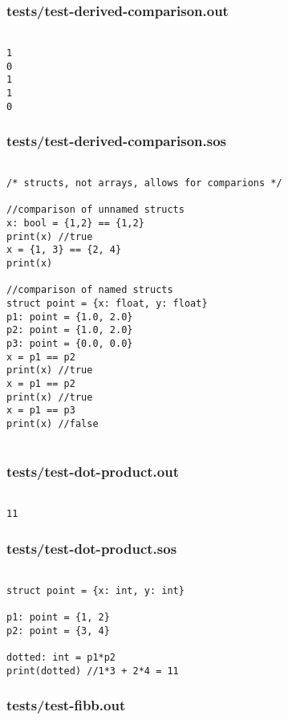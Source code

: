 \documentclass[main.tex]{subfiles}
\begin{document}
\subsubsection{tests/test-derived-comparison.out}

\begin{lstlisting}

1
0
1
1
0
\end{lstlisting}

\subsubsection{tests/test-derived-comparison.sos}

\begin{lstlisting}

/* structs, not arrays, allows for comparions */

//comparison of unnamed structs
x: bool = {1,2} == {1,2}
print(x) //true
x = {1, 3} == {2, 4}
print(x)

//comparison of named structs
struct point = {x: float, y: float}
p1: point = {1.0, 2.0}
p2: point = {1.0, 2.0}
p3: point = {0.0, 0.0}
x = p1 == p2
print(x) //true
x = p1 == p2
print(x) //true
x = p1 == p3
print(x) //false


\end{lstlisting}

\subsubsection{tests/test-dot-product.out}

\begin{lstlisting}

11
\end{lstlisting}

\subsubsection{tests/test-dot-product.sos}

\begin{lstlisting}

struct point = {x: int, y: int}

p1: point = {1, 2}
p2: point = {3, 4}

dotted: int = p1*p2
print(dotted) //1*3 + 2*4 = 11
\end{lstlisting}

\subsubsection{tests/test-fibb.out}
\end{document}
